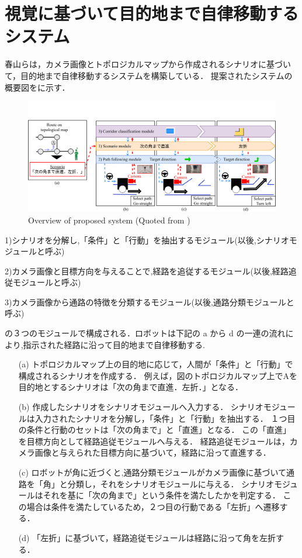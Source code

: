 \section{視覚に基づいて目的地まで自律移動するシステム}
春山らは，カメラ画像とトポロジカルマップから作成されるシナリオに基づいて，目的地まで自律移動するシステムを構築している．
提案されたシステムの概要図をに示す．

\begin{figure}[htbp]
  \centering
   \includegraphics[width=130mm]{images/pdf/haruyama/system.pdf}
   \caption{Overview of proposed system (Quoted from \cite{haruyama2023})}
   \label{fig:sys}
\end{figure}

1)シナリオを分解し,「条件」と「行動」を抽出するモジュール(以後,シナリオモジュールと呼ぶ)

2)カメラ画像と目標方向を与えることで,経路を追従するモジュール(以後,経路追従モジュールと呼ぶ)

3)カメラ画像から通路の特徴を分類するモジュール(以後,通路分類モジュールと呼ぶ)

の３つのモジュールで構成される．ロボットは下記の a から d の一連の流れにより,指示された経路に沿って目的地まで自律移動する.
\begin{enumerate}
  \item [(a)] 
  トポロジカルマップ上の目的地に応じて，人間が「条件」と「行動」で構成されるシナリオを作成する．
  例えば，図のトポロジカルマップ上でAを目的地とするシナリオは「次の角まで直進．左折．」となる．
  \item [(b)] 
  作成したシナリオをシナリオモジュールへ入力する．
  シナリオモジュールは入力されたシナリオを分解し，「条件」と「行動」を抽出する．
  １つ目の条件と行動のセットは「次の角まで」と「直進」となる．
  この「直進」を目標方向として経路追従モジュールへ与える．
  経路追従モジュールは，カメラ画像と与えられた目標方向に基づいて，経路に沿って直進する．
  \item [(c)] 
  ロボットが角に近づくと,通路分類モジュールがカメラ画像に基づいて通路を「角」と分類し，それをシナリオモジュールに与える．
  シナリオモジュールはそれを基に「次の角まで」という条件を満たしたかを判定する．
  この場合は条件を満たしているため，２つ目の行動である「左折」へ遷移する．
  \item [(d)]「左折」に基づいて，経路追従モジュールは経路に沿って角を左折する．
\end{enumerate}

